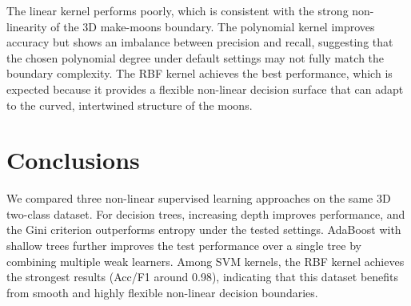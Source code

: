 \documentclass{article}
\begin{document}
The linear kernel performs poorly, which is consistent with the strong non-linearity of the 3D make-moons boundary. The polynomial kernel improves accuracy but shows an imbalance between precision and recall, suggesting that the chosen polynomial degree under default settings may not fully match the boundary complexity. The RBF kernel achieves the best performance, which is expected because it provides a flexible non-linear decision surface that can adapt to the curved, intertwined structure of the moons.

\section{Conclusions}
\label{sec:conclusions}

We compared three non-linear supervised learning approaches on the same 3D two-class dataset.
For decision trees, increasing depth improves performance, and the Gini criterion outperforms entropy under the tested settings.
AdaBoost with shallow trees further improves the test performance over a single tree by combining multiple weak learners.
Among SVM kernels, the RBF kernel achieves the strongest results (Acc/F1 around 0.98), indicating that this dataset benefits from smooth and highly flexible non-linear decision boundaries.


\printbibliography



\end{document}
